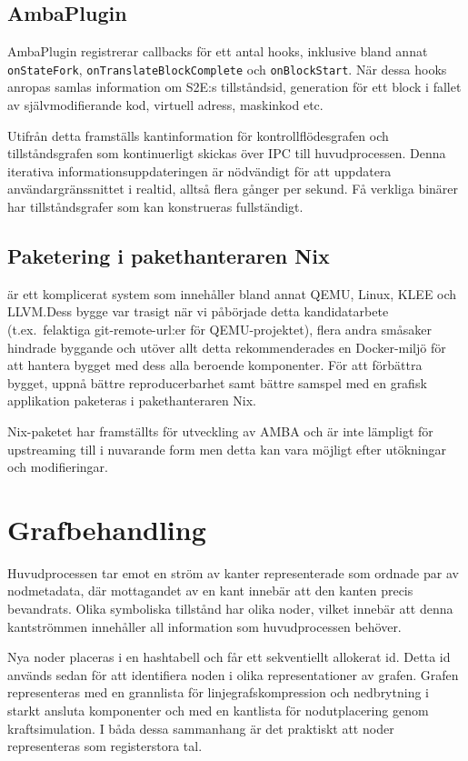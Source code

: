 \subsection{AmbaPlugin}

AmbaPlugin registrerar callbacks för ett antal hooks, inklusive bland annat
\texttt{onStateFork}, \texttt{onTranslateBlockComplete} och
\texttt{onBlockStart}. När dessa hooks anropas samlas information om S2E:s
tillståndsid, generation för ett block i fallet av självmodifierande kod,
virtuell adress, maskinkod etc.

Utifrån detta framställs kantinformation för kontrollflödesgrafen och
tillståndsgrafen som kontinuerligt skickas över IPC till huvudprocessen. Denna
iterativa informationsuppdateringen är nödvändigt för att uppdatera
användargränssnittet i realtid, alltså flera gånger per sekund. Få verkliga
binärer har tillståndsgrafer som kan konstrueras fullständigt.

\subsection{Paketering i pakethanteraren Nix}

\stoe{} är ett komplicerat system som innehåller bland annat QEMU, Linux, KLEE
och LLVM.\@ Dess bygge var trasigt när vi påbörjade detta kandidatarbete (t.ex.\
felaktiga git-remote-url:er för QEMU-projektet), flera andra småsaker hindrade
byggande och utöver allt detta rekommenderades en Docker-miljö för att hantera
bygget med dess alla beroende komponenter. För att förbättra bygget, uppnå
bättre reproducerbarhet samt bättre samspel med en grafisk applikation paketeras
\stoe{} i pakethanteraren Nix.

Nix-paketet \stoe{} har framställts för utveckling av AMBA och är inte lämpligt
för upstreaming till \stoe{} i nuvarande form men detta kan vara möjligt efter
utökningar och modifieringar.

\section{Grafbehandling}

Huvudprocessen tar emot en ström av kanter representerade som ordnade par av
nodmetadata, där mottagandet av en kant innebär att den kanten precis
bevandrats. Olika symboliska tillstånd har olika noder, vilket innebär att denna
kantströmmen innehåller all information som huvudprocessen behöver.

Nya noder placeras i en hashtabell och får ett sekventiellt allokerat id. Detta
id används sedan för att identifiera noden i olika representationer av grafen.
Grafen representeras med en grannlista för linjegrafskompression och nedbrytning
i starkt ansluta komponenter och med en kantlista för nodutplacering genom
kraftsimulation. I båda dessa sammanhang är det praktiskt att noder
representeras som registerstora tal.

